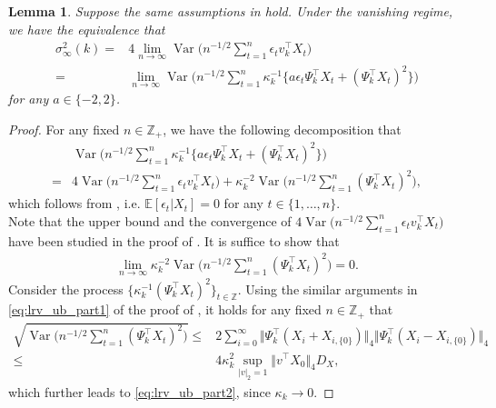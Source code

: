 \documentclass[11pt]{article}
\DeclareMathOperator*{\var}{Var}
\theoremstyle{plain}
\newtheorem{lemma}[theorem]{Lemma}
\theoremstyle{definition}
\begin{document}
\begin{lemma}\label{lemma:long-run_equiv}
Suppose the same assumptions in  hold. Under the vanishing regime, we have the equivalence that
\begin{align}\label{eq:long-run_var2}
    \sigma_{\infty}^2(k)
    =& 4\lim_{n \to \infty}\var\bigg(n^{-1/2}\sum_{t = 1}^n \epsilon_tv_k^{\top}X_t  \bigg) \nonumber\\
    =& \lim_{n \to \infty}\var\bigg(n^{-1/2}\sum_{t = 1}^n \kappa_k^{-1}\big\{a\epsilon_t\Psi_k^{\top}X_t + (\Psi_k^{\top}X_t)^2\big\} \bigg)
\end{align}
for any $a \in \{-2, 2\}$.
\end{lemma}
\begin{proof}
For any fixed $n \in \mathbb{Z}_+$, we have the following decomposition that
\begin{align*}
    &\var\bigg(n^{-1/2}\sum_{t = 1}^n\kappa_k^{-1}\big\{a\epsilon_t \Psi_k^{\top}X_t + (\Psi_k^{\top}X_t)^2\big\} \bigg)\\
    =& 4\var\bigg(n^{-1/2}\sum_{t = 1}^n \epsilon_t v_k^{\top}X_t\bigg) + \kappa_k^{-2}\var\bigg(n^{-1/2}\sum_{t = 1}^n (\Psi_k^{\top}X_t)^2 \bigg),
\end{align*}
which follows from , i.e. $\mathbb E[\epsilon_t|X_t] = 0$ for any $t \in \{1, \dots, n\}$.
\
\\
Note that the upper bound and the convergence of $4\var\bigg(n^{-1/2}\sum_{t = 1}^n \epsilon_t v_k^{\top}X_t\bigg)$ have been studied in the proof of . It is suffice to show that
\begin{align}\label{eq:lrv_ub_part2}
    \lim_{n \to \infty}\kappa_k^{-2}\var\bigg(n^{-1/2}\sum_{t = 1}^n (\Psi_k^{\top}X_t)^2 \bigg) = 0.
\end{align}
Consider the process $\{\kappa_k^{-1}(\Psi_k^{\top}X_t)^2\}_{t \in \mathbb{Z}}$. Using the similar arguments in \eqref{eq:lrv_ub_part1} of the proof of , it holds for any fixed $n \in \mathbb{Z}_+$ that 
    \begin{align*}
        \sqrt{\var\bigg(n^{-1/2}\sum_{t = 1}^n (\Psi_k^{\top}X_t)^2 \bigg)} \leq& 2\sum_{i = 0}^{\infty}\big\Vert \Psi_k^{\top}(X_i + X_{i,\{0\}})\big\Vert_4\big\Vert \Psi_k^{\top}(X_i - X_{i,\{0\}})\big\Vert_{4} \nonumber\\
        \leq& 4\kappa_k^2 \sup_{|v|_2 = 1}\big\Vert v^{\top} X_0\big \Vert_4D_X,
    \end{align*}
which further leads to \eqref{eq:lrv_ub_part2}, since $\kappa_k \to 0$.
\end{proof}
\end{document}
